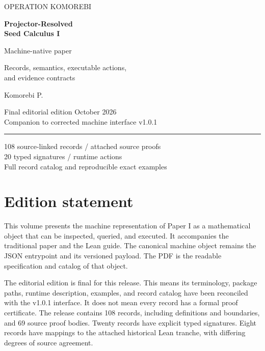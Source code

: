 \documentclass[a4paper,11pt]{article}
\begin{document}
\begin{titlepage}
\vspace*{22mm}
{\color{teal}\large OPERATION KOMOREBI\par}
\vspace{10mm}
{\Huge\bfseries Projector-Resolved\\[3mm]Seed Calculus I\par}
\vspace{10mm}
{\LARGE Machine-native paper\par}
\vspace{5mm}
{\Large Records, semantics, executable actions,\\and evidence contracts\par}
\vspace{18mm}
{\large Komorebi P.\par}
\vspace{3mm}
Final editorial edition  October 2026\\
Companion to corrected machine interface v1.0.1
\vfill
\rule{\textwidth}{0.6pt}\par
108 source-linked records \enspace /  attached source proofs\\
20 typed signatures \enspace /  runtime actions\\
Full record catalog and reproducible exact examples
\end{titlepage}
\section*{Edition statement}
This volume presents the machine representation of Paper I as a mathematical object that can be inspected, queried, and executed. It accompanies the traditional paper and the Lean guide. The canonical machine object remains the JSON entrypoint and its versioned payload. The PDF is the readable specification and catalog of that object.

The editorial edition is final for this release. This means its terminology, package paths, runtime description, examples, and record catalog have been reconciled with the v1.0.1 interface. It does not mean every record has a formal proof certificate. The release contains 108 records, including definitions and boundaries, and 69 source proof bodies. Twenty records have explicit typed signatures. Eight records have mappings to the attached historical Lean tranche, with differing degrees of source agreement.
\end{document}
